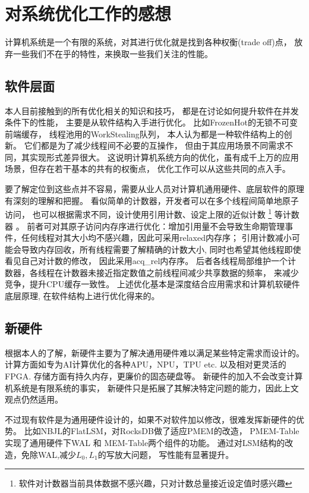 \section{对系统优化工作的感想}

计算机系统是一个有限的系统，对其进行优化就是找到各种权衡(trade off)点，
放弃一些我们不在乎的特性，来换取一些我们关注的性能。

\subsection{软件层面}

本人目前接触到的所有优化相关的知识和技巧，
都是在讨论如何提升软件在并发条件下的性能，
主要是从软件结构入手进行优化。
比如FrozenHot的无锁不可变前端缓存\cite{qiu_frozenhot_2023}，
线程池用的WorkStealing队列，
本人认为都是一种软件结构上的创新。
它们都是为了减少线程间不必要的互操作，
但由于其应用场景不同需求不同，其实现形式差异很大。
这说明计算机系统方向的优化，虽有成千上万的应用场景，但存在若干基本的共有的权衡点，
优化工作可以从这些共同的点入手。

要了解定位到这些点并不容易，需要从业人员对计算机通用硬件、底层软件的原理有深刻的理解和把握。
看似简单的计数器，开发者可以在多个线程间简单地原子访问，
也可以根据需求不同，设计使用引用计数、设定上限的近似计数
\footnote{软件对计数器当前具体数据不感兴趣，只对计数总量接近设定值时感兴趣}
等计数器
\cite{perfbook}。
前者可对其原子访问内存序进行优化：增加引用量不会导致生命期管理事件，任何线程对其大小均不感兴趣，因此可采用relaxed内存序；
引用计数减小可能会导致内存回收，所有线程需要了解精确的计数大小, 同时也希望其他线程即使看见自己对计数的修改，
因此采用acq\_rel内存序。
后者各线程局部维护一个计数器，各线程在计数器未接近指定数值之前线程间减少共享数据的频率，
来减少竞争，提升CPU缓存一致性。
上述优化基本是深度结合应用需求和计算机软硬件底层原理,
在软件结构上进行优化得来的。

\subsection{新硬件}

根据本人的了解，新硬件主要为了解决通用硬件难以满足某些特定需求而设计的。
计算方面如专为AI计算优化的各种APU，NPU，TPU etc. 以及相对更灵活的FPGA.
存储方面有持久内存，更廉价的固态硬盘等。
新硬件的加入不会改变计算机系统是有限系统的事实，
新硬件只是拓展了其解决特定问题的能力，因此上文观点仍然适用。

不过现有软件是为通用硬件设计的，如果不对软件加以修改，很难发挥新硬件的优势。
比如NBJL的FlatLSM，对RocksDB做了适应PMEM的改造，
PMEM-Table实现了通用硬件下WAL 和 MEM-Table两个组件的功能。
通过对LSM结构的改造，免除WAL,减少$L_0, L_1$的写放大问题，
写性能有显著提升\cite{he_flatlsm_2023}。

